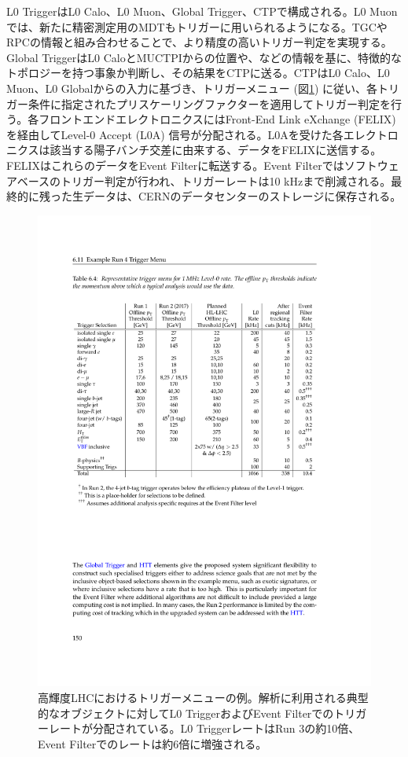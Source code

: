 L0 TriggerはL0 Calo、L0 Muon、Global Trigger、CTPで構成される。L0 Muonでは、新たに精密測定用のMDTもトリガーに用いられるようになる。TGCやRPCの情報と組み合わせることで、より精度の高いトリガー判定を実現する。Global TriggerはL0 CaloとMUCTPIからの位置や\pt、\Et などの情報を基に、特徴的なトポロジーを持つ事象か判断し、その結果をCTPに送る。CTPはL0 Calo、L0 Muon、L0 Globalからの入力に基づき、トリガーメニュー (図\ref{Phase2_Triggermenu}) に従い、各トリガー条件に指定されたプリスケーリングファクターを適用してトリガー判定を行う。各フロントエンドエレクトロニクスにはFront-End Link eXchange  (FELIX) を経由してLevel-0 Accept (L0A) 信号が分配される。L0Aを受けた各エレクトロニクスは該当する陽子バンチ交差に由来する、データをFELIXに送信する。FELIXはこれらのデータをEvent Filterに転送する。Event Filterではソフトウェアベースのトリガー判定が行われ、トリガーレートは10 kHzまで削減される。最終的に残った生データは、CERNのデータセンターのストレージに保存される。

\begin{figure} 
\centering
\includegraphics[width=16cm]{fig/Intro/Phase2_Triggermenu.pdf}
\caption[高輝度LHCにおけるトリガーメニューの例]{高輝度LHCにおけるトリガーメニューの例\cite{tdr_phase2tdaq_2017020}。解析に利用される典型的なオブジェクトに対してL0 TriggerおよびEvent Filterでのトリガーレートが分配されている。L0 TriggerレートはRun 3の約10倍、Event Filterでのレートは約6倍に増強される。}
\label{Phase2_Triggermenu}
\end{figure}

